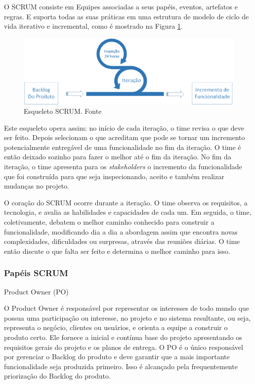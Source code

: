 O SCRUM consiste em Equipes associadas a seus papéis, eventos, artefatos e regras. E suporta todas as suas práticas em uma estrutura de modelo de ciclo de vida iterativo e incremental, como é mostrado na Figura \ref{esqueletoscrum}. \cite{scrumguide}

\begin{figure}[!htb]
	\centering
		\includegraphics[scale=0.5]{figuras/esqueletoscrum.eps}
		\caption{Esqueleto SCRUM. Fonte \cite{schwaber2004}}
		\label{esqueletoscrum}
\end{figure}

Este esqueleto opera assim: no início de cada iteração, o time revisa o que deve ser feito. Depois selecionam o que acreditam que pode se tornar um incremento potencialmente entregável de uma funcionalidade no fim da iteração. O time é então deixado sozinho para fazer o melhor até o fim da iteração. No fim da iteração, o time apresenta para os \textit{stakeholders} o incremento da funcionalidade que foi construída para que seja inspecionando, aceito e também realizar mudanças no projeto. \cite{kenvolaro}

O coração do SCRUM ocorre durante a iteração. O time observa os requisitos, a tecnologia, e avalia as habilidades e capacidades de cada um. Em seguida, o time, coletivamente, debatem o melhor caminho conhecido para construir a funcionalidade, modificando dia a dia a abordagem assim que encontra novas complexidades, dificuldades ou surpresas, através das reuniões diárias. O time então discute o que falta ser feito e determina o melhor caminho para isso. \cite{schwaber2004}

\subsubsection{Papéis SCRUM}
Product Owner (PO)

O Product Owner é responsável por representar os interesses de todo mundo que possua uma participação ou interesse, no projeto e no sistema resultante, ou seja, representa o negócio, clientes ou usuários, e orienta a equipe a construir o produto certo. \cite{mountaingoat} Ele fornece a inicial e contínua base do projeto apresentando os requisitos gerais do projeto e os planos de entrega. O PO é o único responsável por gerenciar o Backlog do produto e deve garantir que a mais importante funcionalidade seja produzida primeiro. Isso é alcançado pela frequentemente priorização do Backlog do produto.\cite{schwaber2004}

